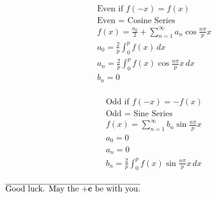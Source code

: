 \documentclass[12pt]{article}
\begin{document}
\begin{multicols}{2}

  \begin{equation*}
    \begin{split}
      \text{Even if } f(-x)=f(x)\\
      \text{Even }=\text{ Cosine Series}\\
      f(x)=\frac{a_0}{2}+\sum_{n=1}^{\infty}a_n\cos\frac{n\pi}{p}x\\
      a_0=\frac{2}{p}\int_0^pf(x)\,dx\\
      a_n=\frac{2}{p}\int_0^pf(x)\cos\frac{n\pi}{p}x\,dx\\
      b_n=0\\
    \end{split}
    \label{11}
  \end{equation*}

  \begin{equation*}
    \begin{split}
      \text{Odd if } f(-x)=-f(x)\\
      \text{Odd }=\text{ Sine Series}\\
      f(x)=\sum_{n=1}^{\infty}b_n\sin\frac{n\pi}{p}x\\
      a_0=0\\
      a_n=0\\
      b_n=\frac{2}{p}\int_0^pf(x)\sin\frac{n\pi}{p}x\,dx\\
    \end{split}
    \label{12}
  \end{equation*}

  \begin{center}
    \Small\vline\textbf{\underline{$\overline{\text{Good luck. May the $\bold{+c}$ be with you.}}$}}\Small\vline
  \end{center}

\end{multicols}
\end{document}
